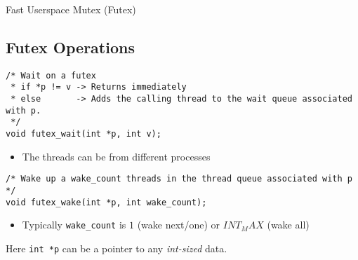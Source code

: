 \begin{definitionbox}{Fast Userspace Mutex (Futex)}

\end{definitionbox}

\subsection{Futex Operations}
\begin{verbatim}
/* Wait on a futex
 * if *p != v -> Returns immediately
 * else       -> Adds the calling thread to the wait queue associated with p.
 */
void futex_wait(int *p, int v);
\end{verbatim}
\begin{itemize}
	\item The threads can be from different processes
\end{itemize}


\begin{verbatim}
/* Wake up a wake_count threads in the thread queue associated with p */
void futex_wake(int *p, int wake_count);
\end{verbatim}
\begin{itemize}
	\item Typically \texttt{wake_count} is $1$ (wake next/one) or $INT_MAX$ (wake all)
\end{itemize}

Here \texttt{int *p} can be a pointer to any \textit{int-sized} data.

